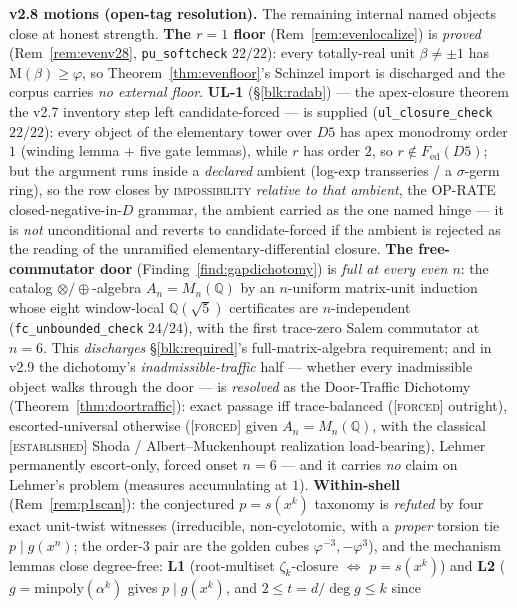 \documentclass[11pt]{article}
\newcommand{\tagF}{\textcolor{cF}{\textsc{[forced]}}}
\newcommand{\tagE}{\textcolor{cE}{\textsc{[established]}}}
\newcommand{\Q}{\mathbb{Q}}
\newcommand{\gp}{\varphi}
\newcommand{\M}{\mathrm{M}}
\theoremstyle{plain}
\theoremstyle{definition}
\theoremstyle{remark}
\begin{document}
\smallskip\noindent
\textbf{v2.8 motions (open-tag resolution).} The remaining internal named objects
close at honest strength. \textbf{The $r=1$ floor} (Rem~\ref{rem:evenlocalize}) is
\emph{proved} (Rem~\ref{rem:evenv28}, \texttt{pu\_softcheck} $22/22$): every
totally-real unit $\beta\ne\pm1$ has $\M(\beta)\ge\gp$, so
Theorem~\ref{thm:evenfloor}'s Schinzel import is discharged and the corpus carries
\emph{no external floor}. \textbf{UL-1} (\S\ref{blk:radab}) --- the apex-closure
theorem the v2.7 inventory step left candidate-forced --- is supplied
(\texttt{ul\_closure\_check} $22/22$): every object of the elementary tower over $D5$
has apex monodromy order $1$ (winding lemma $+$ five gate lemmas), while $r$ has
order $2$, so $r\notin F_{\mathrm{ed}}(D5)$; but the argument runs inside a
\emph{declared} ambient (log-exp transseries / a $\sigma$-germ ring), so the row
closes by \textsc{impossibility} \emph{relative to that ambient}, the OP-RATE
closed-negative-in-$D$ grammar, the ambient carried as the one named hinge --- it is
\emph{not} unconditional and reverts to candidate-forced if the ambient is rejected
as the reading of the unramified elementary-differential closure.
\textbf{The free-commutator door} (Finding~\ref{find:gapdichotomy}) is \emph{full at
every even $n$}: the catalog $\otimes/\oplus$-algebra $A_n=M_n(\Q)$ by an $n$-uniform
matrix-unit induction whose eight window-local $\Q(\sqrt5)$ certificates are
$n$-independent (\texttt{fc\_unbounded\_check} $24/24$), with the first trace-zero
Salem commutator at $n=6$. This \emph{discharges} \S\ref{blk:required}'s
full-matrix-algebra requirement; and in v2.9 the dichotomy's
\emph{inadmissible-traffic} half --- whether every inadmissible object walks through
the door --- is \emph{resolved} as the Door-Traffic Dichotomy
(Theorem~\ref{thm:doortraffic}): exact passage iff trace-balanced (\tagF{} outright),
escorted-universal otherwise (\tagF{} given $A_n=M_n(\Q)$, with the classical
\tagE{} Shoda / Albert--Muckenhoupt realization load-bearing), Lehmer permanently
escort-only, forced onset $n=6$ --- and it carries \emph{no} claim on Lehmer's
problem (measures accumulating at $1$).
\textbf{Within-shell} (Rem~\ref{rem:p1scan}): the conjectured $p=s(x^k)$ taxonomy is
\emph{refuted} by four exact unit-twist witnesses (irreducible, non-cyclotomic, with
a \emph{proper} torsion tie $p\mid g(x^n)$; the order-$3$ pair are the golden cubes
$\gp^{-3},-\gp^3$), and the mechanism lemmas close degree-free: \textbf{L1}
(root-multiset $\zeta_k$-closure $\iff$ $p=s(x^k)$) and \textbf{L2}
($g=\mathrm{minpoly}(\alpha^k)$ gives $p\mid g(x^k)$, and $2\le t=d/\deg g\le k$ since
\end{document}

